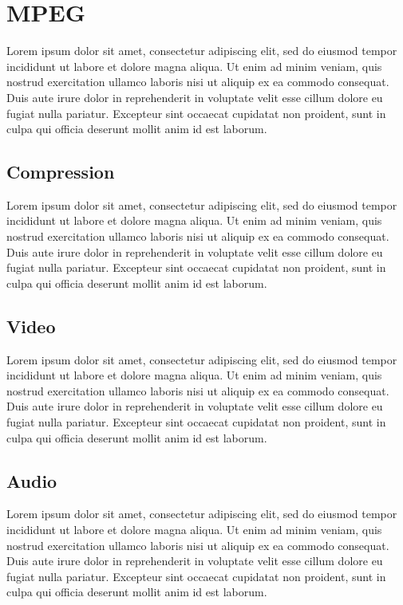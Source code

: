 \section{MPEG}
Lorem ipsum dolor sit amet, consectetur adipiscing elit, sed do eiusmod tempor incididunt ut labore et dolore magna aliqua. Ut enim ad minim veniam, quis nostrud exercitation ullamco laboris nisi ut aliquip ex ea commodo consequat. Duis aute irure dolor in reprehenderit in voluptate velit esse cillum dolore eu fugiat nulla pariatur. Excepteur sint occaecat cupidatat non proident, sunt in culpa qui officia deserunt mollit anim id est laborum.

\subsection{Compression}
Lorem ipsum dolor sit amet, consectetur adipiscing elit, sed do eiusmod tempor incididunt ut labore et dolore magna aliqua. Ut enim ad minim veniam, quis nostrud exercitation ullamco laboris nisi ut aliquip ex ea commodo consequat. Duis aute irure dolor in reprehenderit in voluptate velit esse cillum dolore eu fugiat nulla pariatur. Excepteur sint occaecat cupidatat non proident, sunt in culpa qui officia deserunt mollit anim id est laborum.

\subsection{Video}
Lorem ipsum dolor sit amet, consectetur adipiscing elit, sed do eiusmod tempor incididunt ut labore et dolore magna aliqua. Ut enim ad minim veniam, quis nostrud exercitation ullamco laboris nisi ut aliquip ex ea commodo consequat. Duis aute irure dolor in reprehenderit in voluptate velit esse cillum dolore eu fugiat nulla pariatur. Excepteur sint occaecat cupidatat non proident, sunt in culpa qui officia deserunt mollit anim id est laborum.

\subsection{Audio}
Lorem ipsum dolor sit amet, consectetur adipiscing elit, sed do eiusmod tempor incididunt ut labore et dolore magna aliqua. Ut enim ad minim veniam, quis nostrud exercitation ullamco laboris nisi ut aliquip ex ea commodo consequat. Duis aute irure dolor in reprehenderit in voluptate velit esse cillum dolore eu fugiat nulla pariatur. Excepteur sint occaecat cupidatat non proident, sunt in culpa qui officia deserunt mollit anim id est laborum.

